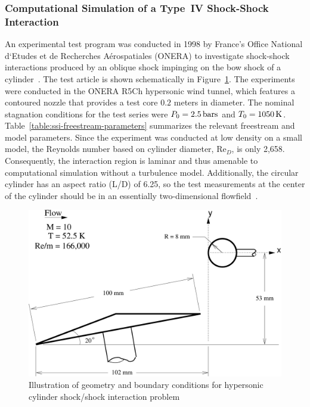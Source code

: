 \subsubsection{Computational Simulation of a Type~IV Shock-Shock Interaction}
An experimental test program was conducted in 1998 by France's Office National d`Etudes et de Recherches A\'{e}rospatiales (ONERA) to investigate shock-shock interactions produced by an oblique shock impinging on the bow shock of a cylinder~\cite{onera-hypersonic-ssi}.  The test article is shown schematically in Figure~\ref{fig:onera_type4_ssi_schematic}.  The experiments were conducted in the ONERA R5Ch hypersonic wind tunnel, which features a contoured nozzle that provides a test core $0.2$ meters in diameter.  The nominal stagnation conditions for the test series were $P_0=\unit[2.5]{bars}$ and $T_0=\unit[1050]{K}$.  Table~\ref{table:ssi-freestream-parameters} summarizes the relevant freestream and model parameters.  Since the experiment was conducted at low density on a small model, the Reynolds number based on cylinder diameter, Re$_D$, is only 2,658.  Consequently, the interaction region is laminar and thus amenable to computational simulation without a turbulence model.  Additionally, the circular cylinder has an aspect ratio (L/D) of 6.25, so the test measurements at the center of the cylinder should be in an essentially two-dimensional flowfield~\cite{onera-dsmc-type4}.

\begin{figure}[hbtp]
  \begin{center}
    \includegraphics[width=.9\textwidth]{figures/onera_type4_ssi/schematic}
    \caption{Illustration of geometry and boundary conditions for hypersonic cylinder shock/shock interaction problem}
    \label{fig:onera_type4_ssi_schematic}
    \end{center}
\end{figure}

